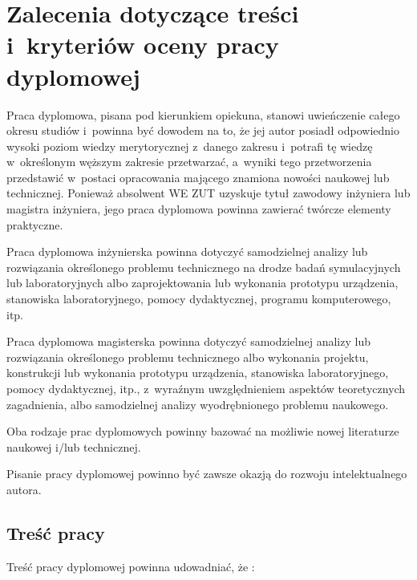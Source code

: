 \documentclass[skorowidz,skroty]{dyplomWEZUT}
\begin{document}


\chapter{Zalecenia dotyczące treści i~kryteriów oceny pracy dyplomowej}\label{chap:pierwszy}

Praca dyplomowa, pisana pod kierunkiem opiekuna, stanowi uwieńczenie całego okresu studiów i~powinna być dowodem na to, że jej autor posiadł odpowiednio wysoki poziom wiedzy merytorycznej z~danego zakresu i~potrafi tę wiedzę w~określonym węższym zakresie przetwarzać, a~wyniki tego przetworzenia przedstawić w~postaci opracowania mającego znamiona nowości naukowej lub technicznej. Ponieważ absolwent WE ZUT uzyskuje tytuł zawodowy inżyniera lub magistra inżyniera, jego praca dyplomowa powinna zawierać twórcze elementy praktyczne. 

Praca dyplomowa inżynierska powinna dotyczyć samodzielnej analizy lub rozwiązania określonego problemu technicznego na drodze badań symulacyjnych lub laboratoryjnych albo zaprojektowania lub wykonania prototypu urządzenia, stanowiska laboratoryjnego, pomocy dydaktycznej, programu komputerowego, itp.

Praca dyplomowa magisterska powinna dotyczyć samodzielnej analizy lub rozwiązania określonego problemu technicznego albo wykonania projektu, konstrukcji lub wykonania prototypu urządzenia, stanowiska laboratoryjnego, pomocy dydaktycznej, itp., z~wyraźnym uwzględnieniem aspektów teoretycznych zagadnienia, albo samodzielnej analizy wyodrębnionego problemu naukowego.

Oba rodzaje prac dyplomowych powinny bazować na możliwie nowej literaturze naukowej i/lub technicznej.

Pisanie pracy dyplomowej powinno być zawsze okazją do rozwoju intelektualnego autora.

\section{Treść pracy}\label{sec:trescpracy}

Treść pracy dyplomowej powinna udowadniać, że \cite{Zenderowski2004}:
\end{document}

